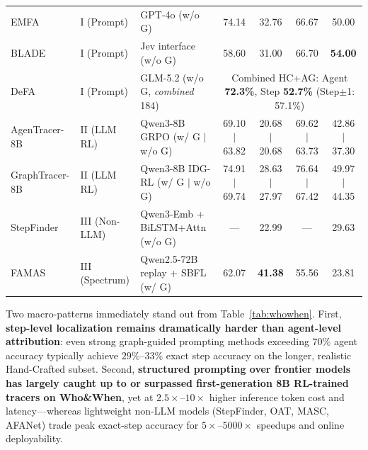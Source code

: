 \begin{table}[h!]
{\begin{tabular}{@{}l l l c c c c@{}}
EMFA~\citep{liao2026emfa} & I (Prompt) & GPT-4o (w/o G) & 74.14 & 32.76 & 66.67 & 50.00 \\
BLADE~\citep{guo2026blade} & I (Prompt) & Jev interface (w/o G) & 58.60 & 31.00 & 66.70 & \textbf{54.00} \\
DeFA~\citep{anonymous2027defa} & I (Prompt) & GLM-5.2 (w/o G, \emph{combined} 184) & \multicolumn{4}{c}{Combined HC+AG: Agent \textbf{72.3\%}, Step \textbf{52.7\%} (Step$\pm$1: 57.1\%)} \\
\midrule
AgenTracer-8B~\citep{zhang2026agentracer} & II (LLM RL) & Qwen3-8B GRPO (w/ G $\mid$ w/o G) & 69.10 $\mid$ 63.82 & 20.68 $\mid$ 20.68 & 69.62 $\mid$ 63.73 & 42.86 $\mid$ 37.30 \\
GraphTracer-8B~\citep{zhang2025graphtracer} & II (LLM RL) & Qwen3-8B IDG-RL (w/ G $\mid$ w/o G) & 74.91 $\mid$ 69.74 & 28.63 $\mid$ 27.97 & 76.64 $\mid$ 67.42 & 49.97 $\mid$ 44.35 \\
\midrule
StepFinder~\citep{zhu2026stepfinder} & III (Non-LLM) & Qwen3-Emb + BiLSTM+Attn (w/o G) & --- & 22.99 & --- & 29.63 \\
FAMAS~\citep{ge2025famas} & III (Spectrum) & Qwen2.5-72B replay + SBFL (w/ G) & 62.07 & \textbf{41.38} & 55.56 & 23.81 \\
\bottomrule
\end{tabular}}
\end{table}

Two macro-patterns immediately stand out from Table~\ref{tab:whowhen}. First, \textbf{step-level localization remains dramatically harder than agent-level attribution}: even strong graph-guided prompting methods exceeding $70\%$ agent accuracy typically achieve $29\%$--$33\%$ exact step accuracy on the longer, realistic Hand-Crafted subset. Second, \textbf{structured prompting over frontier models has largely caught up to or surpassed first-generation 8B RL-trained tracers on Who\&When}, yet at $2.5\times$--$10\times$ higher inference token cost and latency---whereas lightweight non-LLM models (StepFinder, OAT, MASC, AFANet) trade peak exact-step accuracy for $5\times$--$5000\times$ speedups and online deployability.
